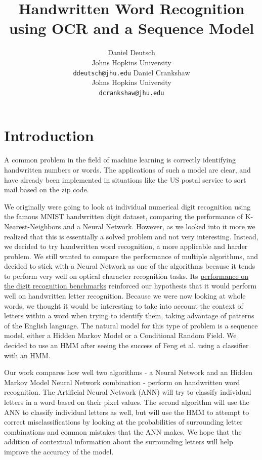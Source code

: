 \documentclass[11pt,letterpaper]{article}
\title{Handwritten Word Recognition using OCR and a Sequence Model}
\author{Daniel Deutsch\\
  Johns Hopkins University\\
  {\tt ddeutsch@jhu.edu}
  \And
  Daniel Crankshaw \\
  Johns Hopkins University \\
  {\tt dcrankshaw@jhu.edu}}
\date{}
\begin{document}
\maketitle

\section{Introduction}

A common problem in the field of machine learning is correctly identifying
handwritten numbers or words. The applications of
such a model are clear, and have already been implemented in situations like
the US postal service to sort mail based on the zip code.

We originally were going to look at individual numerical digit recognition using the famous
MNIST handwritten digit dataset, comparing the performance of K-Nearest-Neighbors and a
Neural Network. However, as we looked into it more we realized that this is essentially a solved
problem and not very interesting. Instead, we decided to try handwritten word recognition,
a more applicable and harder problem. We still wanted to compare the performance of multiple
algorithms, and decided to stick with a Neural Network as one of the algorithms because it tends to
perform very well on optical character recognition tasks. Its \href{http://yann.lecun.com/exdb/mnist/index.html}{performance on the digit recognition benchmarks} reinforced our hypothesis that it would perform well on handwritten letter
recognition. Because we were now looking at whole words, we thought it would be interesting to take
into account the context of letters within a word when trying to identify them, taking advantage of
patterns of the English language. The natural model for this type of problem is a sequence model,
either a Hidden Markov Model or a Conditional Random Field. We decided to use an HMM after seeing
the success of Feng et al. \cite{feng} using a classifier with an HMM.

Our work compares how well two algorithms - a Neural Network and an Hidden Markov Model Neural
Network combination - perform on handwritten word recognition. The Artificial Neural Network (ANN) will
try to classify individual letters in a word based on their pixel values. The second algorithm will
use the ANN to classify individual letters as well, but will use the HMM to attempt to correct
misclassifications by looking at the probabilities of surrounding letter combinations and common
mistakes that the ANN makes. We hope that the addition of contextual information
about the surrounding letters will help improve the accuracy of the model.
\end{document}
